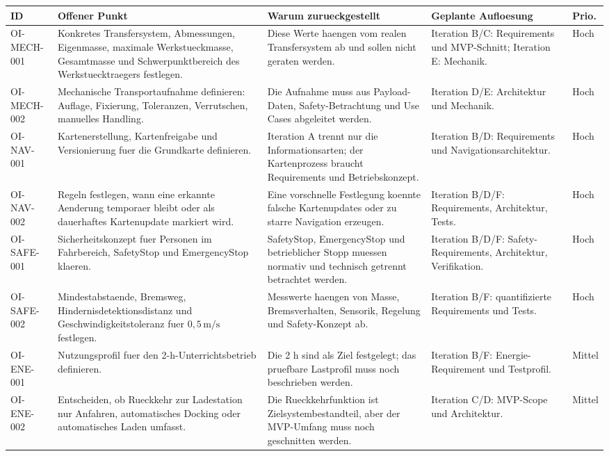 \begin{longtable}{L{0.13\textwidth} L{0.30\textwidth} L{0.22\textwidth} L{0.17\textwidth} L{0.08\textwidth}}
\toprule
ID & Offener Punkt & Warum zurueckgestellt & Geplante Aufloesung & Prio. \\
\midrule
OI-MECH-001 & Konkretes Transfersystem, Abmessungen, Eigenmasse, maximale Werkstueckmasse, Gesamtmasse und Schwerpunktbereich des Werkstuecktraegers festlegen. & Diese Werte haengen vom realen Transfersystem ab und sollen nicht geraten werden. & Iteration B/C: Requirements und MVP-Schnitt; Iteration E: Mechanik. & Hoch \\
OI-MECH-002 & Mechanische Transportaufnahme definieren: Auflage, Fixierung, Toleranzen, Verrutschen, manuelles Handling. & Die Aufnahme muss aus Payload-Daten, Safety-Betrachtung und Use Cases abgeleitet werden. & Iteration D/E: Architektur und Mechanik. & Hoch \\
OI-NAV-001 & Kartenerstellung, Kartenfreigabe und Versionierung fuer die Grundkarte definieren. & Iteration A trennt nur die Informationsarten; der Kartenprozess braucht Requirements und Betriebskonzept. & Iteration B/D: Requirements und Navigationsarchitektur. & Hoch \\
OI-NAV-002 & Regeln festlegen, wann eine erkannte Aenderung temporaer bleibt oder als dauerhaftes Kartenupdate markiert wird. & Eine vorschnelle Festlegung koennte falsche Kartenupdates oder zu starre Navigation erzeugen. & Iteration B/D/F: Requirements, Architektur, Tests. & Hoch \\
OI-SAFE-001 & Sicherheitskonzept fuer Personen im Fahrbereich, SafetyStop und EmergencyStop klaeren. & SafetyStop, EmergencyStop und betrieblicher Stopp muessen normativ und technisch getrennt betrachtet werden. & Iteration B/D/F: Safety-Requirements, Architektur, Verifikation. & Hoch \\
OI-SAFE-002 & Mindestabstaende, Bremsweg, Hindernisdetektionsdistanz und Geschwindigkeitstoleranz fuer $0{,}5\,\mathrm{m/s}$ festlegen. & Messwerte haengen von Masse, Bremsverhalten, Sensorik, Regelung und Safety-Konzept ab. & Iteration B/F: quantifizierte Requirements und Tests. & Hoch \\
OI-ENE-001 & Nutzungsprofil fuer den 2-h-Unterrichtsbetrieb definieren. & Die 2 h sind als Ziel festgelegt; das pruefbare Lastprofil muss noch beschrieben werden. & Iteration B/F: Energie-Requirement und Testprofil. & Mittel \\
OI-ENE-002 & Entscheiden, ob Rueckkehr zur Ladestation nur Anfahren, automatisches Docking oder automatisches Laden umfasst. & Die Rueckkehrfunktion ist Zielsystembestandteil, aber der MVP-Umfang muss noch geschnitten werden. & Iteration C/D: MVP-Scope und Architektur. & Mittel \\

\end{longtable}
